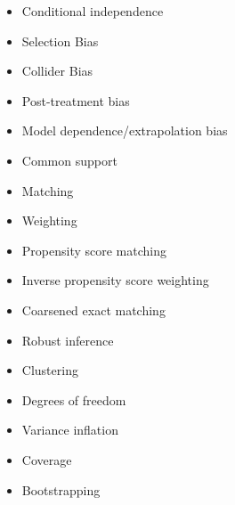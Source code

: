 \documentclass[12pt]{article}
\begin{document}
\begin{itemize}
\item Conditional independence
\item Selection Bias
\item Collider Bias
\item Post-treatment bias
\item Model dependence/extrapolation bias
\item Common support
\item Matching
\item Weighting
\item Propensity score matching
\item Inverse propensity score weighting
\item Coarsened exact matching
\item Robust inference
\item Clustering
\item Degrees of freedom
\item Variance inflation
\item Coverage
\item Bootstrapping
\end{itemize}
\end{document}
